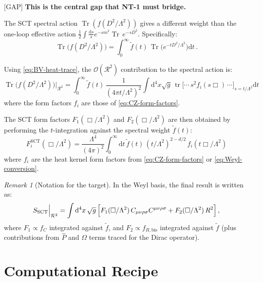 \documentclass[12pt,a4paper]{article}
\theoremstyle{definition}
\theoremstyle{remark}
\newtheorem{remark}[proposition]{Remark}
\newcommand{\Tr}{\operatorname{Tr}}
\newcommand{\tr}{\operatorname{tr}}
\newcommand{\Weylsq}{C_{\mu\nu\rho\sigma}C^{\mu\nu\rho\sigma}}
\newcommand{\dd}{\mathrm{d}}
\newcommand{\gap}{\textcolor{red!80!black}{\textsf{[GAP]}}}
\begin{document}
\gap\; \textbf{This is the central gap that NT-1 must bridge.}

The SCT spectral action $\Tr(f(D^2/\Lambda^2))$ gives a different
weight than the one-loop effective action $\frac{1}{2}\int\frac{\dd s}{s}
e^{-sm^2}\Tr\,e^{-sD^2}$.  Specifically:
\begin{equation}
  \Tr\!\bigl(f(D^2/\Lambda^2)\bigr)
  = \int_0^\infty \tilde{f}(t)\,\Tr\!\bigl(e^{-tD^2/\Lambda^2}\bigr)\dd t\,.
  \label{eq:spectral-vs-eff}
\end{equation}

Using \eqref{eq:BV-heat-trace}, the $\mathcal{O}(\mathcal{R}^2)$
contribution to the spectral action is:
\begin{equation}
  \Tr\!\bigl(f(D^2/\Lambda^2)\bigr)\Big|_{\mathcal{R}^2}
  = \int_0^\infty \tilde{f}(t)\,\frac{1}{(4\pi t/\Lambda^2)^2}
  \int\dd^4x\sqrt{g}\,\tr\bigl[
  \cdots\, s^2 f_i(s\Box)\,\cdots
  \bigr]_{s=t/\Lambda^2}\dd t
  \label{eq:spectral-R2}
\end{equation}
where the form factors $f_i$ are those of \eqref{eq:CZ-form-factors}.

The SCT form factors $F_1(\Box/\Lambda^2)$ and $F_2(\Box/\Lambda^2)$
are then obtained by performing the $t$-integration against the spectral
weight $\tilde{f}(t)$:
\begin{equation}
  \boxed{
  F_i^{\text{SCT}}(\Box/\Lambda^2)
  = \frac{\Lambda^4}{(4\pi)^2}\int_0^\infty \dd t\,
    \tilde{f}(t)\, (t/\Lambda^2)^{2-d/2}\,
    f_i(t\Box/\Lambda^2)
  }
  \label{eq:SCT-form-factor}
\end{equation}
where $f_i$ are the heat kernel form factors from
\eqref{eq:CZ-form-factors} or \eqref{eq:Weyl-conversion}.

\begin{remark}[Notation for the target]
In the Weyl basis, the final result is written as:
\begin{equation}
  S_{\text{SCT}}\Big|_{\mathcal{R}^2}
  = \int\dd^4x\,\sqrt{g}\,\Bigl[
  F_1(\Box/\Lambda^2)\,\Weylsq
  + F_2(\Box/\Lambda^2)\,R^2
  \Bigr]\,,
  \label{eq:target}
\end{equation}
where $F_1 \propto f_C$ integrated against $\tilde{f}$,
and $F_2 \propto f_{R,\text{bis}}$ integrated against $\tilde{f}$
(plus contributions from $\hat{P}$ and $\Omega$ terms traced for
the Dirac operator).
\end{remark}


\newpage
\section{Computational Recipe}
\label{sec:recipe}
\end{document}
